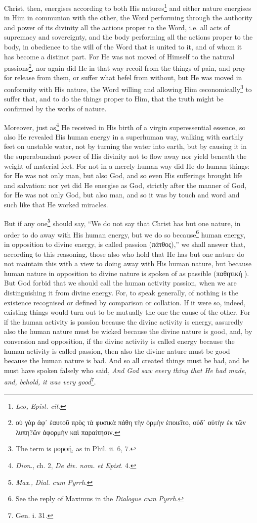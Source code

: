 Christ, then, energises according to both His natures\footnote{\emph{Leo, Epist. cit}.} and either nature energises in Him in communion with the other, the Word performing through the authority and power of its divinity all the actions proper to the Word, i.e. all acts of supremacy and sovereignty, and the body performing all the actions proper to the body, in obedience to the will of the Word that is united to it, and of whom it has become a distinct part. For He was not moved of Himself to the natural passions\footnote{\textgreek{οὐ γὰρ ἀφ᾽ ἑαυτοῦ πρὸς τὰ φυσικὰ πάθη τὴν ὁρμὴν ἐποιεῖτο, οὐδ᾽ αὐτὴν ἐκ τῶν λυπη?ῶν ἁφορμὴν καὶ παραίτησιν}.}, nor again did He in that way recoil from the things of pain, and pray for release from them, or suffer what befel from without, but He was moved in conformity with His nature, the Word willing and allowing Him œconomically\footnote{The term is \textgreek{μορφή}, as in Phil. ii. 6, 7.} to suffer that, and to do the things proper to Him, that the truth might be confirmed by the works of nature.

Moreover, just as\footnote{\emph{Dion}., ch. 2, \emph{De div. nom. et Epist}. 4.} He received in His birth of a virgin superessential essence, so also He revealed His human energy in a superhuman way, walking with earthly feet on unstable water, not by turning the water into earth, but by causing it in the superabundant power of His divinity not to flow away nor yield beneath the weight of material feet. For not in a merely human way did He do human things: for He was not only man, but also God, and so even His sufferings brought life and salvation: nor yet did He energise as God, strictly after the manner of God, for He was not only God, but also man, and so it was by touch and word and such like that He worked miracles.

But if any one\footnote{\emph{Max.,} \emph{Dial. cum Pyrrh}.} should say, “We do not say that Christ has but one nature, in order to do away with His human energy, but we do so because\footnote{See the reply of Maximus in the \emph{Dialogue cum Pyrrh}.} human energy, in opposition to divine energy, is called passion (\textgreek{πάτθος)},” we shall answer that, according to this reasoning, those also who hold that He has but one nature do not maintain this with a view to doing away with His human nature, but because human nature in opposition to divine nature is spoken of as passible (\textgreek{παθητική )}. But God forbid that we should call the human activity passion, when we are distinguishing it from divine energy. For, to speak generally, of nothing is the existence recognised or defined by comparison or collation. If it were so, indeed, existing things would turn out to be mutually the one the cause of the other. For if the human activity is passion because the divine activity is energy, assuredly also the human nature must be wicked because the divine nature is good, and, by conversion and opposition, if the divine activity is called energy because the human activity is called passion, then also the divine nature must be good because the human nature is bad. And so all created things must be bad, and he must have spoken falsely who said, \emph{And God saw every thing that He had made, and, behold, it was very good}\footnote{Gen. i. 31.}.

